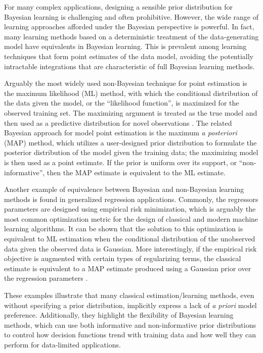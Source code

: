 \documentclass[12pt]{article}
\begin{document}
For many complex applications, designing a sensible prior distribution for Bayesian learning is challenging and often prohibitive. However, the wide range of learning approaches afforded under the Bayesian perspective is powerful. In fact, many learning methods based on a deterministic treatment of the data-generating model have equivalents in Bayesian learning. This is prevalent among learning techniques that form point estimates of the data model, avoiding the potentially intractable integrations that are characteristic of full Bayesian learning methods.

Arguably the most widely used non-Bayesian technique for point estimation is the maximum likelihood (ML) method, with which the conditional distribution of the data given the model, or the ``likelihood function'', is maximized for the observed training set. The maximizing argument is treated as the true model and then used as a predictive distribution for novel observations \cite{theodoridis-ML}. The related Bayesian approach for model point estimation is the maximum \emph{a posteriori} (MAP) method, which utilizes a user-designed prior distribution to formulate the posterior distribution of the model given the training data; the maximizing model is then used as a point estimate. If the prior is uniform over its support, or ``non-informative'', then the MAP estimate is equivalent to the ML estimate.

Another example of equivalence between Bayesian and non-Bayesian learning methods is found in generalized regression applications. Commonly, the regressors parameters are designed using empirical risk minimization, which is arguably the most common optimization metric for the design of classical and modern machine learning algorithms. It can be shown that the solution to this optimization is equivalent to ML estimation when the conditional distribution of the unobserved data given the observed data is Gaussian. More interestingly, if the empirical risk objective is augmented with certain types of  regularizing terms, the classical estimate is equivalent to a MAP estimate produced using a Gaussian prior over the regression parameters \cite{theodoridis-ML}. 

These examples illustrate that many classical estimation/learning methods, even without specifying a prior distribution, implicitly express a lack of \emph{a priori} model preference. Additionally, they highlight the flexibility of Bayesian learning methods, which can use both informative and non-informative prior distributions to control how decision functions trend with training data and how well they can perform for data-limited applications.
\end{document}
